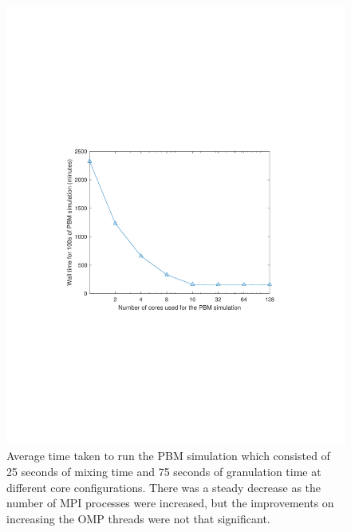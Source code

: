 \documentclass[preprint,11pt,authoryear]{elsarticle}
\begin{document}
\begin{figure}[H]
\centering
\includegraphics[scale=0.75]{rslsts_PBM_timing.pdf}
\caption{Average time taken to run the PBM simulation which consisted of 25 seconds of mixing time 
and 75 seconds of granulation time at different core configurations. There was a steady decrease as 
the number of MPI processes were increased, but the improvements on increasing the OMP threads were 
not that significant.}
\label{fig:rslts_PBM_timing_studies}
\end{figure}
\end{document}
